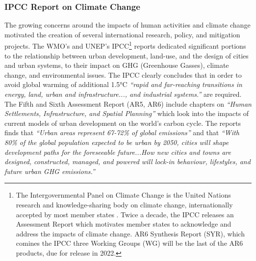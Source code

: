 {{        \subsubsection{IPCC Report on Climate Change}
        {
            The growing concerns around the impacts of human activities and climate change motivated the creation of several international research, policy, and mitigation projects. The WMO's and UNEP's IPCC\footnote{The Intergovernmental Panel on Climate Change is the United Nations research and knowledge-sharing body on climate change, internationally accepted by most member states \cite{shukla2019ipcc}. Twice a decade, the IPCC releases an Assessment Report which motivates member states to acknowledge and address the impacts of climate change. AR6 Synthesis Report (SYR), which comines the IPCC three Working Groups (WG) will be the last of the AR6 products, due for release in 2022.} reports dedicated significant portions to the relationship between urban development, land-use, and the design of cities and urban systems, to their impact on GHG (Greenhouse Gasses), climate change, and environmental issues. The IPCC clearly concludes that in order to avoid global warming of additional 1.5°C \textit{``rapid and far-reaching transitions in energy, land, urban and infrastructure..., and industrial systems.''}\cite{allen2019technical} are required. The Fifth and Sixth Assessment Report (AR5, AR6) include chapters on \textit{``Human Settlements, Infrastructure, and Spatial Planning''} which look into the impacts of current models of urban development on the world's carbon cycle. The reports finds that \textit{``Urban areas represent 67-72\% of global emissions''} and that \textit{``With 80\% of the global population expected to be urban by 2050, cities will shape development paths for the foreseeable future...How new cities and towns are designed, constructed, managed, and powered will lock-in behaviour, lifestyles, and future urban GHG emissions.''}\cite{IPCC_AR6_22}
            \newline
}}}
